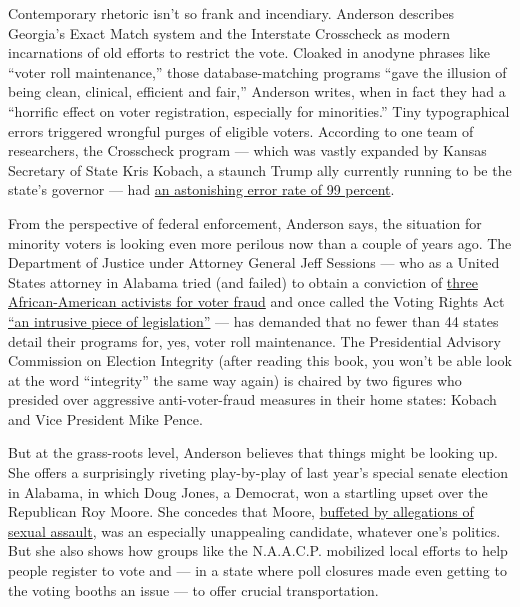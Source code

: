 Contemporary rhetoric isn't so frank and incendiary. Anderson describes
Georgia's Exact Match system and the Interstate Crosscheck as modern
incarnations of old efforts to restrict the vote. Cloaked in anodyne
phrases like ``voter roll maintenance,'' those database-matching
programs ``gave the illusion of being clean, clinical, efficient and
fair,'' Anderson writes, when in fact they had a ``horrific effect on
voter registration, especially for minorities.'' Tiny typographical
errors triggered wrongful purges of eligible voters. According to one
team of researchers, the Crosscheck program --- which was vastly
expanded by Kansas Secretary of State Kris Kobach, a staunch Trump ally
currently running to be the state's governor --- had
\href{https://www.washingtonpost.com/news/wonk/wp/2017/07/20/this-anti-voter-fraud-program-gets-it-wrong-over-99-of-the-time-the-gop-wants-to-take-it-nationwide/?utm_term=.f1ecacd402ec}{an
astonishing error rate of 99 percent}.

From the perspective of federal enforcement, Anderson says, the
situation for minority voters is looking even more perilous now than a
couple of years ago. The Department of Justice under Attorney General
Jeff Sessions --- who as a United States attorney in Alabama tried (and
failed) to obtain a conviction of
\href{https://www.nytimes3xbfgragh.onion/2017/01/09/magazine/the-voter-fraud-case-jeff-sessions-lost-and-cant-escape.html}{three
African-American activists for voter fraud} and once called the Voting
Rights Act
\href{https://www.nytimes3xbfgragh.onion/2017/01/08/us/politics/jeff-sessions-attorney-general.html}{``an
intrusive piece of legislation''} --- has demanded that no fewer than 44
states detail their programs for, yes, voter roll maintenance. The
Presidential Advisory Commission on Election Integrity (after reading
this book, you won't be able look at the word ``integrity'' the same way
again) is chaired by two figures who presided over aggressive
anti-voter-fraud measures in their home states: Kobach and Vice
President Mike Pence.

But at the grass-roots level, Anderson believes that things might be
looking up. She offers a surprisingly riveting play-by-play of last
year's special senate election in Alabama, in which Doug Jones, a
Democrat, won a startling upset over the Republican Roy Moore. She
concedes that Moore,
\href{https://www.nytimes3xbfgragh.onion/2017/11/16/us/roy-moore-alabama-coverage.html}{buffeted
by allegations of sexual assault}, was an especially unappealing
candidate, whatever one's politics. But she also shows how groups like
the N.A.A.C.P. mobilized local efforts to help people register to vote
and --- in a state where poll closures made even getting to the voting
booths an issue --- to offer crucial transportation.

